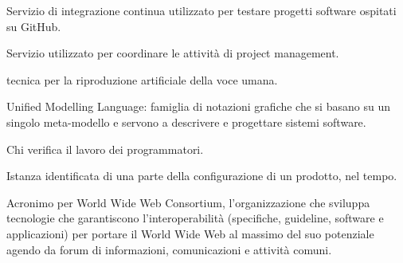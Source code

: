 \item[Travis] Servizio di integrazione continua utilizzato per testare progetti software ospitati su GitHub.
\item[Trello] Servizio utilizzato per coordinare le attività di project management.
\item[Text-to-Speech] tecnica per la riproduzione artificiale della voce umana.
\item[UML] Unified Modelling Language: famiglia di notazioni grafiche che si basano su un singolo meta-modello e servono a descrivere e progettare sistemi software.
\item[verificatore] Chi verifica il lavoro dei programmatori.
\item[versione] Istanza identificata di una parte della configurazione di un prodotto, nel tempo.
\item[W3C] Acronimo per World Wide Web Consortium, l'organizzazione che sviluppa tecnologie che garantiscono l'interoperabilità (specifiche, guideline, software e applicazioni) per portare il World Wide Web al massimo del suo potenziale agendo da forum di informazioni, comunicazioni e attività comuni. 
